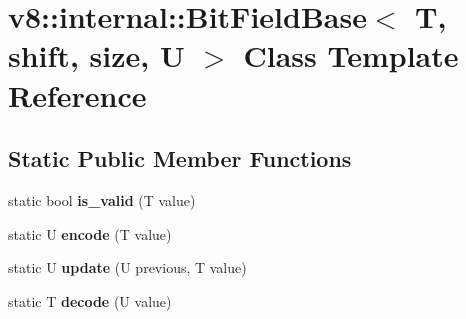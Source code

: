 \hypertarget{classv8_1_1internal_1_1_bit_field_base}{}\section{v8\+:\+:internal\+:\+:Bit\+Field\+Base$<$ T, shift, size, U $>$ Class Template Reference}
\label{classv8_1_1internal_1_1_bit_field_base}
\subsection*{Static Public Member Functions}
\begin{DoxyCompactItemize}
\item 
\hypertarget{classv8_1_1internal_1_1_bit_field_base_a2bdc1abbe7bcef7acf38a7862eb1b591}{}static bool {\bfseries is\+\_\+valid} (T value)\label{classv8_1_1internal_1_1_bit_field_base_a2bdc1abbe7bcef7acf38a7862eb1b591}

\item 
\hypertarget{classv8_1_1internal_1_1_bit_field_base_aa162659173f7f724b50e31d89c0f3fa8}{}static U {\bfseries encode} (T value)\label{classv8_1_1internal_1_1_bit_field_base_aa162659173f7f724b50e31d89c0f3fa8}

\item 
\hypertarget{classv8_1_1internal_1_1_bit_field_base_a0ce53f2db72ce51d96606fc0c9f353db}{}static U {\bfseries update} (U previous, T value)\label{classv8_1_1internal_1_1_bit_field_base_a0ce53f2db72ce51d96606fc0c9f353db}

\item 
\hypertarget{classv8_1_1internal_1_1_bit_field_base_aa251f75c99718dea15a4f90ad42db161}{}static T {\bfseries decode} (U value)\label{classv8_1_1internal_1_1_bit_field_base_aa251f75c99718dea15a4f90ad42db161}

\end{DoxyCompactItemize}
